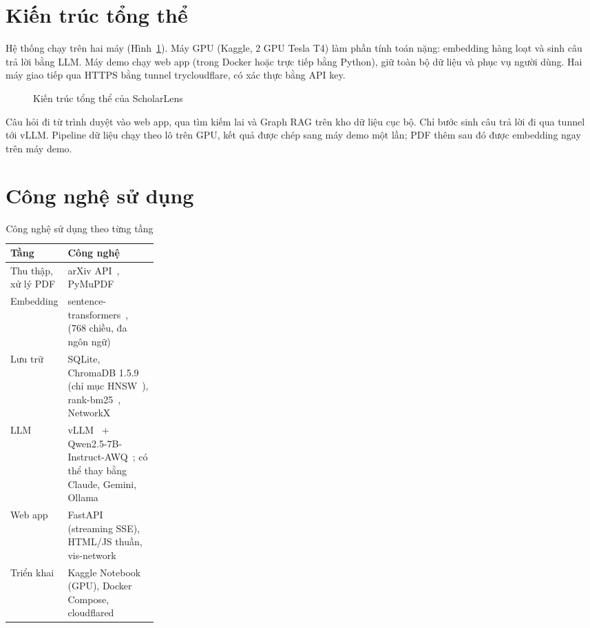 \section{Kiến trúc tổng thể}

Hệ thống chạy trên hai máy (Hình~\ref{fig:kientruc}). Máy GPU (Kaggle, 2 GPU Tesla T4) làm phần tính toán nặng:
embedding hàng loạt và sinh câu trả lời bằng LLM. Máy demo chạy web app (trong Docker hoặc trực tiếp bằng Python),
giữ toàn bộ dữ liệu và phục vụ người dùng. Hai máy giao tiếp qua HTTPS bằng tunnel trycloudflare, có xác thực bằng
API key.

\begin{figure}[H]
\centering

\caption{Kiến trúc tổng thể của ScholarLens}\label{fig:kientruc}
\end{figure}

Câu hỏi đi từ trình duyệt vào web app, qua tìm kiếm lai và Graph RAG trên kho dữ liệu cục bộ. Chỉ bước sinh câu
trả lời đi qua tunnel tới vLLM. Pipeline dữ liệu chạy theo lô trên GPU, kết quả được chép sang máy demo một lần;
PDF thêm sau đó được embedding ngay trên máy demo.

\section{Công nghệ sử dụng}

\begin{table}[H]
\centering\small{}
\begin{tabularx}{\linewidth}{@{}P{0.25\linewidth}L@{}}
\toprule
\textbf{Tầng} & \textbf{Công nghệ}\\
\midrule
Thu thập, xử lý PDF & arXiv API~\cite{arxivapi}, PyMuPDF\\
Embedding & sentence-transformers~\cite{sbert}, ~\cite{me5} (768 chiều, đa ngôn ngữ)\\
Lưu trữ & SQLite, ChromaDB 1.5.9 (chỉ mục HNSW~\cite{hnsw}), rank-bm25~\cite{bm25}, NetworkX~\cite{networkx}\\
LLM & vLLM~\cite{vllm} + Qwen2.5-7B-Instruct-AWQ~\cite{qwen25,awq}; có thể thay bằng Claude, Gemini, Ollama\\
Web app & FastAPI (streaming SSE), HTML/JS thuần, vis-network\\
Triển khai & Kaggle Notebook (GPU), Docker Compose, cloudflared\\
\bottomrule
\end{tabularx}
\caption{Công nghệ sử dụng theo từng tầng}\label{tab:congnghe}
\end{table}

